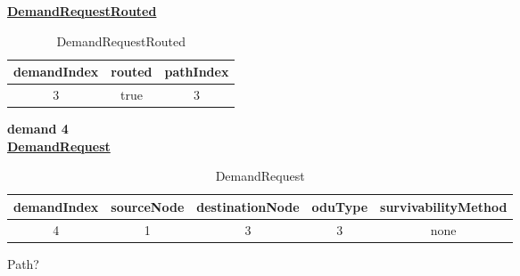 \underline{\textbf{DemandRequestRouted}}

\begin{table}[H]
	\centering
	\begin{tabular}{| c | c | c |}
		\hline
		\textbf{demandIndex} & \textbf{routed}  & \textbf{pathIndex}\\ \hline
		3                    & true             & 3                 \\ \hline
	\end{tabular}
	\caption{DemandRequestRouted}
	\label{demand_request_routed}
\end{table}

\textbf{demand 4}\\

\underline{\textbf{DemandRequest}}

\begin{table}[H]
	\centering
	\begin{tabular}{| c | c | c | c | c |}
		\hline
		\textbf{demandIndex} & \textbf{sourceNode} & \textbf{destinationNode} & \textbf{oduType} & \textbf{survivabilityMethod}\\ \hline
		4                    & 1                   & 3                        & 3                & none						   \\ \hline
	\end{tabular}
	\caption{DemandRequest}
	\label{demand_request}
\end{table}

Path?\\

\begin{table}[H]
	\centering
	\caption{paths}
	\label{paths}
\end{table}

